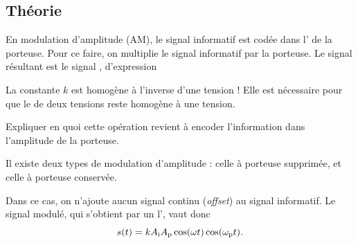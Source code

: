 \subsection{Théorie}
En modulation d'amplitude (AM), le signal informatif est codée dans l' de la porteuse.
 Pour ce faire, on multiplie le signal informatif par la porteuse. Le signal résultant est le signal , d’expression
\begin{danger}[1]
    La constante $k$ est homogène à l'inverse d'une tension ! Elle est nécessaire pour que le  de deux tensions reste homogène à une tension.
\end{danger}
    \begin{protocole}
      \todo	Expliquer en quoi cette opération revient à encoder l’information dans l’amplitude de la porteuse. 
    \end{protocole}
%
Il existe deux types de modulation d'amplitude : celle à porteuse supprimée, et celle à porteuse conservée. 

Dans ce cas, on n’ajoute aucun signal continu (\emph{offset}) au signal informatif.
Le signal modulé, qui s’obtient par un l’, vaut donc
\begin{equation}
 s(t) = kA_{\rm{i}}A_{\rm{p}}\cos(\omega t)\cos(\omega_{\rm{p}} t).
 \end{equation}


